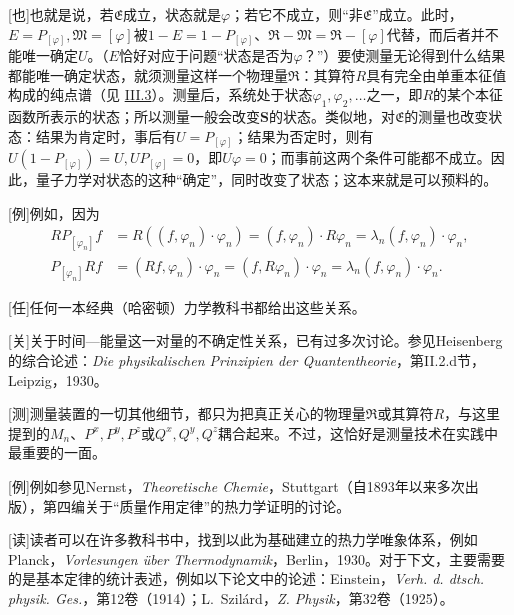 \documentclass[fontsize=13pt,twoside,openany,headings=normal,parskip=false,bookmarkpackage=false,DIV=calc]{scrbook}
\begin{document}
[也]{\hypertarget{origpage-259}{}\label{origpage-259}也就是说，若$\mathfrak E$成立，状态就是$\varphi$；若它不成立，则“非$\mathfrak E$”成立。此时，$E=P_{[\varphi]},\allowbreak \mathfrak M=[\varphi]$被$1-E=1-P_{[\varphi]}$、$\mathfrak R-\mathfrak M=\mathfrak R-[\varphi]$代替，而后者并不能唯一确定$U$。（$E$恰好对应于问题“状态是否为$\varphi$？”）要使测量无论得到什么结果都能唯一确定状态，就须测量这样一个物理量$\mathfrak R$：其算符$R$具有完全由单重本征值构成的纯点谱（见 \hyperref[sec:III.3]{III.3}）。测量后，系统处于状态$\varphi_1,\allowbreak \varphi_2,\allowbreak \ldots$之一，即$R$的某个本征函数所表示的状态；所以测量一般会改变$\boldsymbol S$的状态。类似地，对$\mathfrak E$的测量也改变状态：结果为肯定时，事后有$U=P_{[\varphi]}$；结果为否定时，则有$U(1-P_{[\varphi]})=U,\allowbreak UP_{[\varphi]}=0$，即$U\varphi=0$；而事前这两个条件可能都不成立。因此，量子力学对状态的这种“确定”，同时改变了状态；这本来就是可以预料的。}

[例]{例如，因为
\begin{align*}
RP_{[\varphi_n]}f&=R((f,\varphi_n)\cdot\varphi_n)
=(f,\varphi_n)\cdot R\varphi_n=\lambda_n(f,\varphi_n)\cdot\varphi_n,\\
P_{[\varphi_n]}Rf&=(Rf,\varphi_n)\cdot\varphi_n
=(f,R\varphi_n)\cdot\varphi_n=\lambda_n(f,\varphi_n)\cdot\varphi_n.
\end{align*}}

[任]{任何一本经典（哈密顿）力学教科书都给出这些关系。}

[关]{关于时间—能量这一对量的不确定性关系，已有过多次讨论。参见Heisenberg的综合论述：\emph{Die physikalischen Prinzipien der Quantentheorie}，第II.2.d节，Leipzig，1930。}

[测]{测量装置的一切其他细节，都只为把真正关心的物理量$\mathfrak R$或其算符$R$，与这里提到的$M_n$、$P^x,\allowbreak P^y,\allowbreak P^z$或$Q^x,\allowbreak Q^y,\allowbreak Q^z$耦合起来。不过，这恰好是测量技术在实践中最重要的一面。}

[例]{例如参见Nernst，\emph{Theoretische Chemie}，Stuttgart（自1893年以来多次出版），第四编关于“质量作用定律”的热力学证明的讨论。}

[读]{读者可以在许多教科书中，找到以此为基础建立的热力学唯象体系，例如Planck，\emph{Vorlesungen über Thermodynamik}，Berlin，1930。对于下文，主要需要的是基本定律的统计表述，例如以下论文中的论述：Einstein，\emph{Verh. d. dtsch. physik. Ges.}，第12卷（1914）；L.~Szilárd，\emph{Z. Physik}，第32卷（1925）。}
\end{document}
